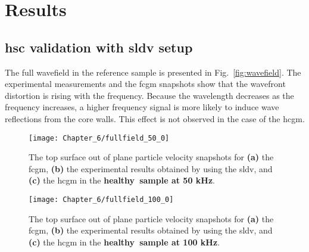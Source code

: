 \section{Results}
\label{sec:resuls}
\subsection{\acs{hsc} validation with \acs{sldv} setup}
The full wavefield in the reference sample is presented in Fig.~\ref{fig:wavefield}.
The experimental measurements and the \ac{fcgm} snapshots show that the wavefront distortion is rising with the frequency.
Because the wavelength decreases as the frequency increases, a higher frequency signal is more likely to induce wave reflections from the core walls.
This effect is not observed in the case of the \ac{hcgm}.
\begin{figure}[!hbt]
	\begin{center}
		\texttt{[image: Chapter\_6/fullfield\_50\_0]}
	\end{center}
	\caption{The top surface out of plane particle velocity snapshots for \textbf{(a)} the \acf{fcgm}, \textbf{(b)} the experimental results obtained by using the \acf{sldv}, and \textbf{(c)} the \acf{hcgm} in the \textbf{healthy~sample at 50 kHz}.}
	\label{fig:fullfield_50_0}
\end{figure}
\begin{figure}[!hbt]
	\begin{center}
		\texttt{[image: Chapter\_6/fullfield\_100\_0]}
	\end{center}
	\caption{The top surface out of plane particle velocity snapshots for \textbf{(a)} the \acf{fcgm}, \textbf{(b)} the experimental results obtained by using the \acf{sldv}, and \textbf{(c)} the \acf{hcgm} in the \textbf{healthy~sample at 100 kHz}.}
	\label{fig:fullfield_100_0}
\end{figure}

